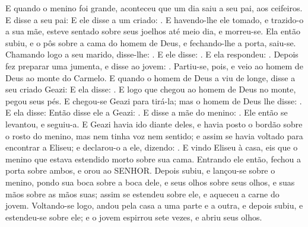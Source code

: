 {  E quando o menino foi grande, aconteceu que um dia saiu a seu pai, aos ceifeiros.
  E disse a seu pai:  E ele disse a um criado: .
  E havendo-lhe ele tomado, e trazido-o a sua mãe, esteve sentado sobre seus joelhos até meio dia, e morreu-se.
  Ela então subiu, e o pôs sobre a cama do homem de Deus, e fechando-lhe a porta, saiu-se.
  Chamando logo a seu marido, disse-lhe: .
  E ele disse: . E ela respondeu: .
  Depois fez preparar uma jumenta, e disse ao jovem: .
  Partiu-se, pois, e veio ao homem de Deus ao monte do Carmelo. E quando o homem de Deus a viu de longe, disse a seu criado Geazi:  E ela disse: .
  E logo que chegou ao homem de Deus no monte, pegou seus pés. E chegou-se Geazi para tirá-la; mas o homem de Deus lhe disse: .
  E ela disse: 
  Então disse ele a Geazi: .
  E disse a mãe do menino: .
  Ele então se levantou, e seguiu-a. E Geazi havia ido diante deles, e havia posto o bordão sobre o rosto do menino, mas nem tinha voz nem sentido; e assim se havia voltado para encontrar a Eliseu; e declarou-o a ele, dizendo: .
  E vindo Eliseu à casa, eis que o menino que estava estendido morto sobre sua cama.
  Entrando ele então, fechou a porta sobre ambos, e orou ao SENHOR.
  Depois subiu, e lançou-se sobre o menino, pondo sua boca sobre a boca dele, e seus olhos sobre seus olhos, e suas mãos sobre as mãos suas; assim se estendeu sobre ele, e aqueceu a carne do jovem.
  Voltando-se logo, andou pela casa a uma parte e a outra, e depois subiu, e estendeu-se sobre ele; e o jovem espirrou sete vezes, e abriu seus olhos.
}
